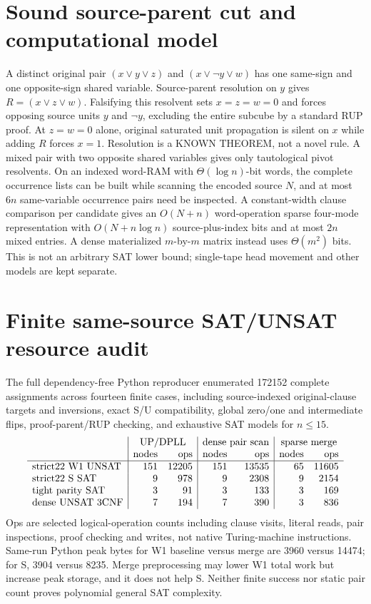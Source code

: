 \documentclass{article}
\begin{document}
\section{Sound source-parent cut and computational model}
A distinct original pair $(x\vee y\vee z)$ and $(x\vee\neg y\vee w)$ has one same-sign and one opposite-sign shared variable. Source-parent resolution on $y$ gives $R=(x\vee z\vee w)$. Falsifying this resolvent sets $x=z=w=0$ and forces opposing source units $y$ and $\neg y$, excluding the entire subcube by a standard RUP proof. At $z=w=0$ alone, original saturated unit propagation is silent on $x$ while adding $R$ forces $x=1$. Resolution is a KNOWN THEOREM, not a novel rule. A mixed pair with two opposite shared variables gives only tautological pivot resolvents.
On an indexed word-RAM with $\Theta(\log n)$-bit words, the complete occurrence lists can be built while scanning the encoded source $N$, and at most $6n$ same-variable occurrence pairs need be inspected. A constant-width clause comparison per candidate gives an $O(N+n)$ word-operation sparse four-mode representation with $O(N+n\log n)$ source-plus-index bits and at most $2n$ mixed entries. A dense materialized $m$-by-$m$ matrix instead uses $\Theta(m^2)$ bits. This is not an arbitrary SAT lower bound; single-tape head movement and other models are kept separate.
\section{Finite same-source SAT/UNSAT resource audit}
The full dependency-free Python reproducer enumerated 172152 complete assignments across fourteen finite cases, including source-indexed original-clause targets and inversions, exact S/U compatibility, global zero/one and intermediate flips, proof-parent/RUP checking, and exhaustive SAT models for $n\le15$.
\[
\begin{array}{l|rr|rr|rr}
&\multicolumn{2}{c|}{\mathrm{UP/DPLL}}&\multicolumn{2}{c|}{\mathrm{dense\ pair\ scan}}&\multicolumn{2}{c}{\mathrm{sparse\ merge}}\\
&\mathrm{nodes}&\mathrm{ops}&\mathrm{nodes}&\mathrm{ops}&\mathrm{nodes}&\mathrm{ops}\\\hline
\mathrm{strict22\ W1\ UNSAT}&151&12205&151&13535&65&11605\\
\mathrm{strict22\ S\ SAT}&9&978&9&2308&9&2154\\
\mathrm{tight\ parity\ SAT}&3&91&3&133&3&169\\
\mathrm{dense\ UNSAT\ 3CNF}&7&194&7&390&3&836
\end{array}
\]
Ops are selected logical-operation counts including clause visits, literal reads, pair inspections, proof checking and writes, not native Turing-machine instructions. Same-run Python peak bytes for W1 baseline versus merge are 3960 versus 14474; for S, 3904 versus 8235. Merge preprocessing may lower W1 total work but increase peak storage, and it does not help S. Neither finite success nor static pair count proves polynomial general SAT complexity.
\end{document}
